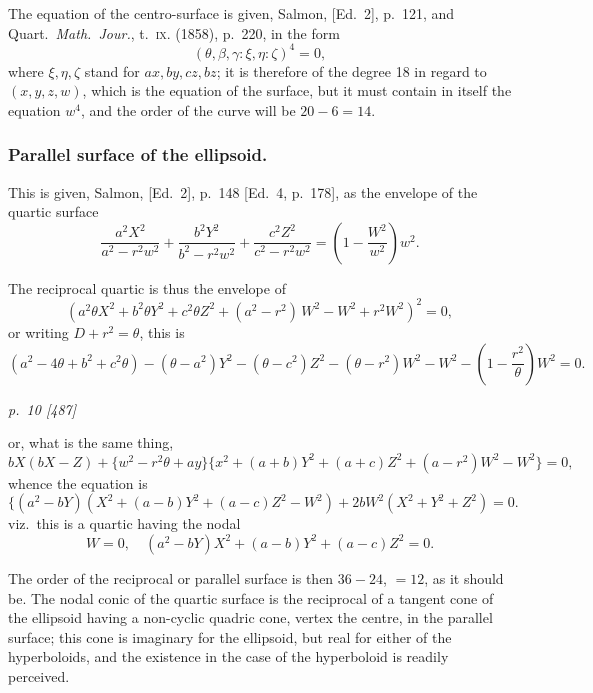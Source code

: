 \documentclass[11pt,a4paper]{book}
\begin{document}
The equation of the centro-surface is given, Salmon, [Ed.\ 2], p.~121, and Quart.\
\textit{Math.\ Jour.}, t.~\textsc{ix.} (1858), p.~220, in the form
\[
(\theta, \beta, \gamma : \xi, \eta : \zeta)^4 = 0,
\]
where $\xi, \eta, \zeta$ stand for $ax, by, cz, bz$; it is therefore of the degree 18 in regard to $(x, y, z, w)$, which is the equation of the surface, but it must contain in itself the equation $w^4$, and the order of the curve will be $20 - 6 = 14$.

\subsubsection*{Parallel surface of the ellipsoid.}

This is given, Salmon, [Ed.\ 2], p.~148 [Ed.\ 4, p.~178], as the envelope of the
quartic surface
\[
\frac{a^2 X^2}{a^2 - r^2 w^2} + \frac{b^2 Y^2}{b^2 - r^2 w^2} + \frac{c^2 Z^2}{c^2 - r^2 w^2} = \left(1 - \frac{W^2}{w^2}\right) w^2.
\]

The reciprocal quartic is thus the envelope of
\[
(a^2 \theta X^2 + b^2 \theta Y^2 + c^2 \theta Z^2 + (a^2 - r^2)\, W^2 - W^2 + r^2 W^2)^2 = 0,
\]
or writing $D + r^2 = \theta$, this is
\[
(a^2 - 4\theta + b^2 + c^2 \theta) - (\theta - a^2)Y^2 - (\theta - c^2)Z^2 - (\theta - r^2)W^2 - W^2 - \left(1 - \frac{r^2}{\theta}\right)W^2 = 0.
\]

\clearpage

\bigskip
\textit{p.~10 [487]}
\smallskip

or, what is the same thing,
\[
b X(b X - Z) + \{w^2 - r^2\theta + ay\}\{x^2 + (a + b)Y^2 + (a + c) Z^2 + (a - r^2) W^2 - W^2\} = 0,
\]
whence the equation is
\[
\{(a^2 - bY)(X^2 + (a - b)Y^2 + (a - c)Z^2 - W^2) + 2bW^2 (X^2 + Y^2 + Z^2) = 0.
\]
viz.\ this is a quartic having the nodal
\[
W = 0, \quad (a^2 - bY)X^2 + (a - b)Y^2 + (a - c)Z^2 = 0.
\]

The order of the reciprocal or parallel surface is then $36 - 24$, $= 12$, as it should be.
The nodal conic of the quartic surface is the reciprocal of a tangent cone of the ellipsoid having a non-cyclic quadric cone, vertex the centre, in the parallel surface; this cone is imaginary for the ellipsoid, but real for either of the hyperboloids, and the existence in the case of the hyperboloid is readily perceived.
\end{document}
